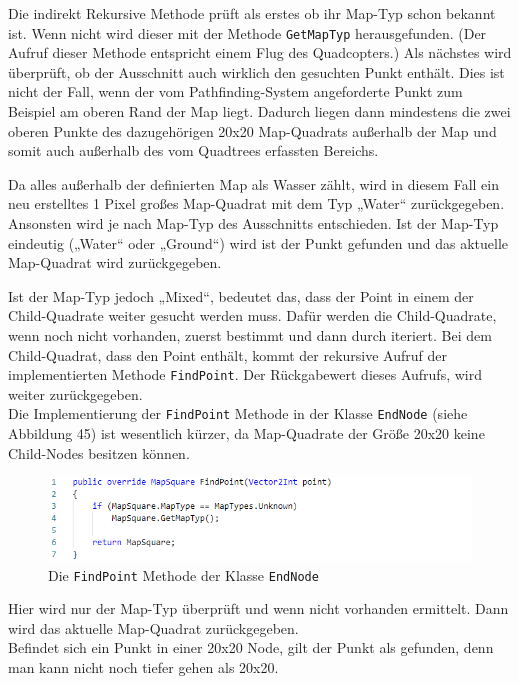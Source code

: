 \documentclass[a4paper,12pt]{article}
\newcommand{\code}{\texttt}
\begin{document}
Die indirekt Rekursive Methode prüft als erstes ob ihr Map-Typ schon bekannt ist. Wenn nicht wird dieser mit der Methode \code{GetMapTyp} herausgefunden. (Der Aufruf dieser Methode entspricht einem Flug des Quadcopters.) Als nächstes wird überprüft, ob der Ausschnitt auch wirklich den gesuchten Punkt enthält. Dies ist nicht der Fall, wenn der vom Pathfinding-System angeforderte Punkt zum Beispiel am oberen Rand der Map liegt. Dadurch liegen dann mindestens die zwei oberen Punkte des dazugehörigen 20x20 Map-Quadrats außerhalb der Map und somit auch außerhalb des vom Quadtrees erfassten Bereichs.

Da alles außerhalb der definierten Map als Wasser zählt, wird in diesem Fall ein neu erstelltes 1 Pixel großes Map-Quadrat mit dem Typ „Water“ zurückgegeben.
\\[0.4cm]
Ansonsten wird je nach Map-Typ des Ausschnitts entschieden. Ist der Map-Typ eindeutig („Water“ oder „Ground“) wird ist der Punkt gefunden und das aktuelle Map-Quadrat wird zurückgegeben.

Ist der Map-Typ jedoch „Mixed“, bedeutet das, dass der Point in einem der Child-Quadrate weiter gesucht werden muss. Dafür werden die Child-Quadrate, wenn noch nicht vorhanden, zuerst bestimmt und dann durch iteriert. Bei dem Child-Quadrat, dass den Point enthält, kommt der rekursive Aufruf der implementierten Methode \code{FindPoint}. Der Rückgabewert dieses Aufrufs, wird weiter zurückgegeben.
\\[0.4cm]
Die Implementierung der \code{FindPoint} Methode in der Klasse \code{EndNode} (siehe Abbildung 45) ist wesentlich kürzer, da Map-Quadrate der Größe 20x20 keine Child-Nodes besitzen können.

\begin{figure}[H]
    \centering
    \includegraphics[width=1\linewidth]{Bilder/Aufgabe3/Teilaufgabe_C/Quadtree_03.png}
    \caption{Die \code{FindPoint} Methode der Klasse \code{EndNode}}
\end{figure}

Hier wird nur der Map-Typ überprüft und wenn nicht vorhanden ermittelt. Dann wird das aktuelle Map-Quadrat zurückgegeben.
\\[0.4cm]
Befindet sich ein Punkt in einer 20x20 Node, gilt der Punkt als gefunden, denn man kann nicht noch tiefer gehen als 20x20.
\end{document}
